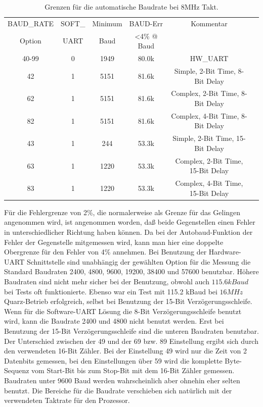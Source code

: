 \begin{table}[H]
  \begin{center}
    \begin{tabular}{| c | c | c | c | c | c |}
    \hline
   BAUD\_RATE  & SOFT\_ & Minimum & BAUD-Err & Kommentar  \\
   Option      & UART   & Baud    & \textless 4\% @ Baud &  \\
    \hline
    \hline
    40-99      &  0     &  1949       &   80.0k  & HW\_UART  \\
    \hline
    42         &  1     &  5151       &   81.6k  & Simple, 2-Bit Time, 8-Bit Delay  \\
    \hline
    62         &  1     &  5151       &   81.6k  & Complex, 2-Bit Time, 8-Bit Delay  \\
    \hline
    82         &  1     &  5151       &   81.6k  & Complex, 4-Bit Time, 8-Bit Delay  \\
    \hline
    43         &  1     &  244       &   53.3k  &  Simple, 2-Bit Time, 15-Bit Delay\\
    \hline
    63         &  1     &  1220       &   53.3k &  Complex, 2-Bit Time, 15-Bit Delay \\
    \hline
    83         &  1     &  1220       &   53.3k & Complex, 4-Bit Time, 15-Bit Delay \\
    \hline
    \end{tabular}
  \end{center}
  \caption{Grenzen für die automatische Baudrate bei 8MHz Takt.}
  \label{tab:AutoBaud8}
\end{table}

Für die Fehlergrenze von 2\%, die normalerweise als Grenze für das Gelingen
angenommen wird, ist angenommen worden, daß beide Gegenstellen einen Fehler
in unterschiedlicher Richtung haben können. Da bei der Autobaud-Funktion
der Fehler der Gegenstelle mitgemessen wird, kann man hier eine doppelte
Obergrenze für den Fehler von 4\% annehmen.
Bei Benutzung der Hardware-UART Schnittstelle sind unabhängig der gewählten
Option für die Messung die Standard Baudraten 2400, 4800, 9600, 19200, 38400 und 57600
benutzbar. Höhere Baudraten sind nicht mehr sicher bei der Benutzung, obwohl
auch \(115.6kBaud\) bei Tests oft funktionierte.
Ebenso war ein Test mit 115.2 kBaud bei \(16 MHz\) Quarz-Betrieb erfolgreich,
selbst bei Benutzung der 15-Bit Verzögerungsschleife.
Wenn für die Software-UART Lösung die 8-Bit Verzögerungsschleife benutzt wird,
kann die Baudrate 2400 und 4800 nicht benutzt werden.
Erst bei Benutzung der 15-Bit Verzögerungsschleife sind die unteren Baudraten
benutzbar. Der Unterschied zwischen der 49 und der 69 bzw. 89 Einstellung ergibt
sich durch den verwendeten 16-Bit Zähler. Bei der Einstellung 49 wird nur
die Zeit von 2 Datenbits gemessen, bei den Einstellungen über 59 wird
die komplette Byte-Sequenz vom Start-Bit bis zum Stop-Bit mit dem 16-Bit Zähler gemessen.
Baudraten unter 9600 Baud werden wahrscheinlich aber ohnehin eher selten benutzt.
Die Bereiche für die Baudrate verschieben sich natürlich mit der verwendeten
Taktrate für den Prozessor.

